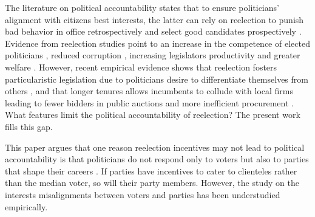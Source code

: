 \documentclass[12pt]{amsart}
\numberwithin{equation}{section}
\theoremstyle{definition}
\theoremstyle{definition}
\theoremstyle{definition}
\begin{document}
The literature on political accountability states that to ensure politicians' alignment with citizens best interests, the latter can rely on reelection to punish bad behavior in office retrospectively and select good candidates prospectively \citep{manin_etal_1999}. Evidence from reelection studies point to an increase in the competence of elected politicians \citep{dalbo_etal_2017}, reduced corruption \citep{ferraz_finan_2011}, increasing legislators productivity \citep{hall_etal_2018} and greater welfare \citep{alt_etal_2011}. However, recent empirical evidence shows that reelection fosters particularistic legislation due to politicians desire to differentiate themselves from others \citep{motolinia_2020}, and that longer tenures allows incumbents to collude with local firms leading to fewer bidders in public auctions and more inefficient procurement \citep{coviello_etal_2017}. %
What features limit the political accountability of reelection? The present work fills this gap.       

This paper argues that one reason reelection incentives may not lead to political accountability is that politicians do not respond only to voters but also to parties that shape their careers \citep{mayhew_1974,moreno_etal_2003,samuels_shugart_2010, klasnja_titiunik_2017}. If parties have incentives to cater to clienteles rather than the median voter, so will their party members. However, the study on the interests misalignments between voters and parties has been understudied empirically. %
\end{document}
